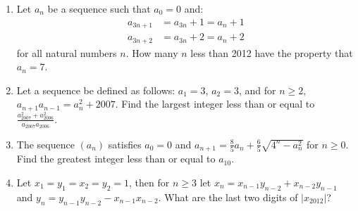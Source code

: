 \documentclass[11pt]{article}
\theoremstyle{theorem}
\theoremstyle{definition}
\theoremstyle{remark}
\theoremstyle{definition}
\theoremstyle{remark}
\begin{document}
\begin{enumerate}
\item Let $a_n$ be a sequence such that $a_0=0$ and:
\begin{align*}
a_{3n+1} &= a_{3n} + 1= a_n + 1 \\
a_{3n+2} &= a_{3n} + 2 = a_n + 2
\end{align*}
for all natural numbers $n$. How many $n$ less than 2012 have the property that $a_n=7$. %
\item Let a sequence be defined as follows: $a_{1}= 3$, $a_{2}= 3$, and for $n \ge 2$, $a_{n+1}a_{n-1}= a_{n}^{2}+2007$. Find the largest integer less than or equal to $\frac{a_{2007}^{2}+a_{2006}^{2}}{a_{2007}a_{2006}}$. %
\item The sequence $(a_n)$ satisfies $a_0=0$ and $a_{n+1}=\frac{8}{5}a_n+\frac{6}{5}\sqrt{4^n-a_n^2}$ for $n\ge 0$. Find the greatest integer less than or equal to $a_{10}$.
\item Let $x_1=y_1=x_2=y_2=1$, then for $n \ge 3$ let $x_n=x_{n-1}y_{n-2}+x_{n-2}y_{n-1}$ and $y_{n}=y_{n-1}y_{n-2}-x_{n-1}x_{n-2}$. What are the last two digits of $|x_{2012}|$? %
\end{enumerate}
\end{document}
